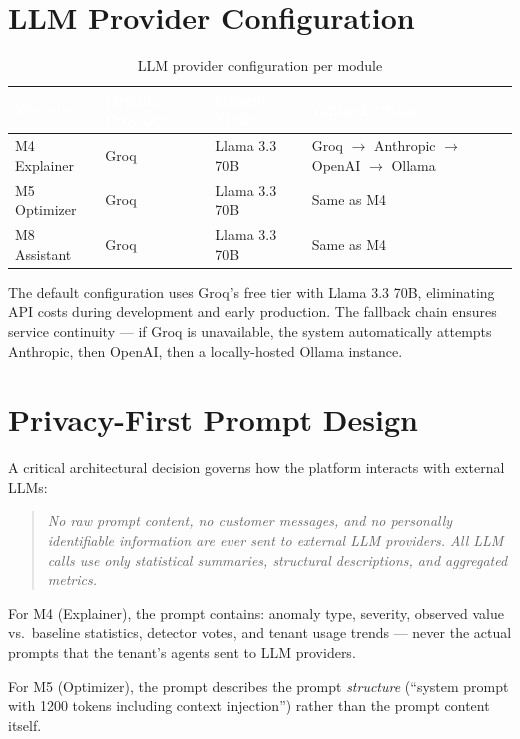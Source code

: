 \documentclass[12pt,a4paper,twoside]{report}
\begin{document}
\section{LLM Provider Configuration}

\begin{table}[H]
\centering
\begin{tabularx}{\textwidth}{|l|l|l|X|}
\hline
\rowcolor{tabheader}
\textcolor{white}{\textbf{Module}} &
\textcolor{white}{\textbf{Default Provider}} &
\textcolor{white}{\textbf{Default Model}} &
\textcolor{white}{\textbf{Fallback Chain}} \\
\hline
M4 Explainer & Groq & Llama 3.3 70B & Groq $\rightarrow$ Anthropic $\rightarrow$ OpenAI $\rightarrow$ Ollama \\
\hline
M5 Optimizer & Groq & Llama 3.3 70B & Same as M4 \\
\hline
M8 Assistant & Groq & Llama 3.3 70B & Same as M4 \\
\hline
\end{tabularx}
\caption{LLM provider configuration per module}
\end{table}

The default configuration uses Groq's free tier with Llama 3.3 70B, eliminating API costs during development and early production. The fallback chain ensures service continuity — if Groq is unavailable, the system automatically attempts Anthropic, then OpenAI, then a locally-hosted Ollama instance.

\section{Privacy-First Prompt Design}

A critical architectural decision governs how the platform interacts with external LLMs:

\begin{quote}
\textit{No raw prompt content, no customer messages, and no personally identifiable information are ever sent to external LLM providers. All LLM calls use only statistical summaries, structural descriptions, and aggregated metrics.}
\end{quote}

For M4 (Explainer), the prompt contains: anomaly type, severity, observed value vs.\ baseline statistics, detector votes, and tenant usage trends — never the actual prompts that the tenant's agents sent to LLM providers.

For M5 (Optimizer), the prompt describes the prompt \textit{structure} (``system prompt with 1200 tokens including context injection'') rather than the prompt content itself.
\end{document}
